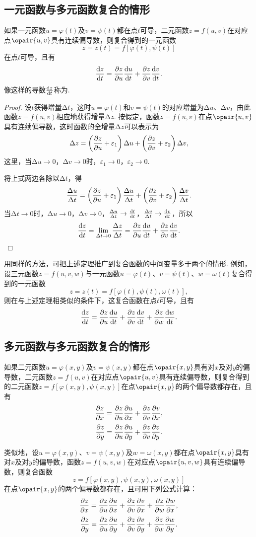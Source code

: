 \subsection{一元函数与多元函数复合的情形}
\begin{theorem}
如果一元函数\(u=\varphi(t)\)及\(v=\psi(t)\)都在点\(t\)可导，二元函数\(z=f(u,v)\)在对应点\(\opair{u,v}\)具有连续偏导数，则复合得到的一元函数\[
z = z(t) = f[\varphi(t),\psi(t)]
\]在点\(t\)可导，且有\[
\dv{z}{t} = \pdv{z}{u}\dv{u}{t} + \pdv{z}{v}\dv{v}{t}.
\]
像这样的导数\(\dv{z}{t}\)称为.
\begin{proof}
\def\D#1#2{\frac{\increment #1}{\increment #2}}
设\(t\)获得增量\(\increment t\)，这时\(u=\varphi(t)\)和\(v=\psi(t)\)的对应增量为\(\increment u\)、\(\increment v\)，由此函数\(z=f(u,v)\)相应地获得增量\(\increment z\).
按假定，函数\(z=f(u,v)\)在点\(\opair{u,v}\)具有连续偏导数，这时函数的全增量\(\increment z\)可以表示为
\[
\Delta z = \left(\pdv{z}{u} + \varepsilon_1\right) \Delta u + \left(\pdv{z}{v} + \varepsilon_2\right) \Delta v,
\]这里，当\(\increment u\to0\)，\(\increment v\to0\)时，\(\varepsilon_1\to0\)，\(\varepsilon_2\to0\).

将上式两边各除以\(\increment t\)，得\[
\D{u}{t} = \left(\pdv{z}{u} + \varepsilon_1\right) \D{u}{t} + \left(\pdv{z}{v} + \varepsilon_2\right) \D{v}{t}.
\]当\(\increment t\to0\)时，\(\increment u\to0\)，\(\increment v\to0\)，\(\D{u}{t} \to \dv{t}{t}\)，\(\D{v}{t} \to \dv{v}{t}\)，所以\[
\dv{z}{t} = \lim\limits_{\increment t\to0}{\D{z}{t}}
= \pdv{z}{u} \dv{u}{t} + \pdv{z}{v} \dv{v}{t}.
\qedhere
\]
\end{proof}
\end{theorem}
用同样的方法，可把上述定理推广到复合函数的中间变量多于两个的情形.
例如，设三元函数\(z=f(u,v,w)\)与一元函数\(u=\varphi(t)\)、\(v=\psi(t)\)、\(w=\omega(t)\)复合得到的一元函数\[
z = z(t) = f[\varphi(t),\psi(t),\omega(t)],
\]则在与上述定理相类似的条件下，这复合函数在点\(t\)可导，且有\[
\dv{z}{t} = \pdv{z}{u}\dv{u}{t} + \pdv{z}{v}\dv{v}{t} + \pdv{z}{w}\dv{w}{t}.
\]

\subsection{多元函数与多元函数复合的情形}
\begin{theorem}
如果二元函数\(u=\varphi(x,y)\)及\(v=\psi(x,y)\)都在点\(\opair{x,y}\)具有对\(x\)及对\(y\)的偏导数，二元函数\(z=f(u,v)\)在对应点\(\opair{u,v}\)具有连续偏导数，则复合得到的二元函数\(z=f[\varphi(x,y),\psi(x,y)]\)在点\(\opair{x,y}\)的两个偏导数都存在，且有\[
\pdv{z}{x} = \pdv{z}{u}\pdv{u}{x} + \pdv{z}{v}\pdv{v}{x},
\]\[
\pdv{z}{y} = \pdv{z}{u}\pdv{u}{y} + \pdv{z}{v}\pdv{v}{y}.
\]
\end{theorem}
类似地，设\(u=\varphi(x,y)\)、\(v=\psi(x,y)\)及\(w=\omega(x,y)\)都在点\(\opair{x,y}\)具有对\(x\)及对\(y\)的偏导数，函数\(z=f(u,v,w)\)在对应点\(\opair{u,v,w}\)具有连续偏导数，则复合函数\[
z = f[\varphi(x,y),\psi(x,y),\omega(x,y)]
\]在点\(\opair{x,y}\)的两个偏导数都存在，且可用下列公式计算：\[
\pdv{z}{x} = \pdv{z}{u}\pdv{u}{x} + \pdv{z}{v}\pdv{v}{x} + \pdv{z}{w}\pdv{w}{x},
\]\[
\pdv{z}{y} = \pdv{z}{u}\pdv{u}{y} + \pdv{z}{v}\pdv{v}{y} + \pdv{z}{w}\pdv{w}{y}.
\]


